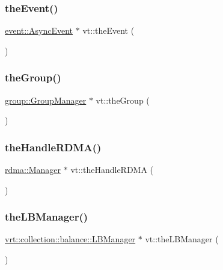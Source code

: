 \mbox{\label{namespacevt_aa297fcaadc8a330890eb90c5b0081ec5}} 
\subsubsection{\texorpdfstring{the\+Event()}{theEvent()}}
{\footnotesize\ttfamily \hyperlink{structvt_1_1event_1_1_async_event}{event\+::\+Async\+Event} $\ast$ vt\+::the\+Event (\begin{DoxyParamCaption}{ }\end{DoxyParamCaption})}

\mbox{\label{namespacevt_a4548473dce44fb654400009e2b2fe64e}} 
\subsubsection{\texorpdfstring{the\+Group()}{theGroup()}}
{\footnotesize\ttfamily \hyperlink{structvt_1_1group_1_1_group_manager}{group\+::\+Group\+Manager} $\ast$ vt\+::the\+Group (\begin{DoxyParamCaption}{ }\end{DoxyParamCaption})}

\mbox{\label{namespacevt_aecb87ec2c40b5b7fc57ba4cf8ea838b0}} 
\subsubsection{\texorpdfstring{the\+Handle\+R\+D\+M\+A()}{theHandleRDMA()}}
{\footnotesize\ttfamily \hyperlink{structvt_1_1rdma_1_1_manager}{rdma\+::\+Manager} $\ast$ vt\+::the\+Handle\+R\+D\+MA (\begin{DoxyParamCaption}{ }\end{DoxyParamCaption})}

\mbox{\label{namespacevt_a05187076eac8c66c9951b062b0955520}} 
\subsubsection{\texorpdfstring{the\+L\+B\+Manager()}{theLBManager()}}
{\footnotesize\ttfamily \hyperlink{structvt_1_1vrt_1_1collection_1_1balance_1_1_l_b_manager}{vrt\+::collection\+::balance\+::\+L\+B\+Manager} $\ast$ vt\+::the\+L\+B\+Manager (\begin{DoxyParamCaption}{ }\end{DoxyParamCaption})}

